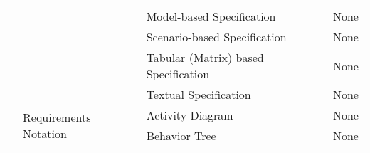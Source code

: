 \begin{table}[]
{\begin{tabular}{clll}
\multicolumn{1}{c|}{}                      &                                                      & Model-based Specification               & None                                                                                                                                                                                                                                                                                                                                      \\
\multicolumn{1}{c|}{}                      &                                                      & Scenario-based Specification            & None                                                                                                                                                                                                                                                                                                                                      \\
\multicolumn{1}{c|}{}                      &                                                      & Tabular (Matrix) based Specification    & None                                                                                                                                                                                                                                                                                                                                      \\
\multicolumn{1}{c|}{}                      &                                                      & Textual Specification                   & None                                                                                                                                                                                                                                                                                                                                      \\ \cline{2-4} 
\multicolumn{1}{c|}{}                      & \multirow{17}{*}{Requirements Notation}              & Activity Diagram                        & None                                                                                                                                                                                                                                                                                                                                      \\
\multicolumn{1}{c|}{}                      &                                                      & Behavior Tree                           & None                                                                                                                                                                                                                                                                                                                                      \\

\end{tabular}}
\end{table}
